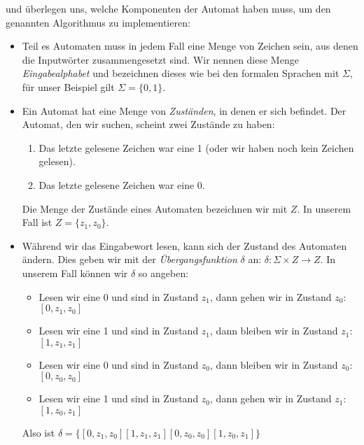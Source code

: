 und überlegen uns, welche Komponenten der Automat haben muss,
um den genannten Algorithmus zu implementieren:
\begin{itemize}
    \item Teil es Automaten muss in jedem Fall eine Menge von Zeichen sein,
        aus denen die Inputwörter zusammengesetzt sind.
        Wir nennen diese Menge \emph{Eingabealphabet}
        und bezeichnen dieses wie bei den formalen Sprachen mit $\Sigma$,
        für unser Beispiel gilt $\Sigma = \{0,1\}$.

    \item Ein Automat hat eine Menge von \emph{Zuständen}, in denen er sich befindet.
        Der Automat, den wir suchen, scheint zwei Zustände zu haben:
        \begin{enumerate}
            \item Das letzte gelesene Zeichen war eine 1
                (oder wir haben noch kein Zeichen gelesen).
            \item Das letzte gelesene Zeichen war eine 0.
        \end{enumerate}
        Die Menge der Zustände eines Automaten bezeichnen wir mit $Z$.
        In unserem Fall ist $Z = \{z_1, z_0\}$.

    \item Während wir das Eingabewort lesen,
        kann sich der Zustand des Automaten ändern.
        Dies geben wir mit der \emph{Übergangsfunktion} $\delta$ an:
        $\delta: \Sigma \times Z \rightarrow Z$.
        In unserem Fall können wir $\delta$ so angeben:
        \begin{itemize}
            \item Lesen wir eine 0 und sind in Zustand $z_1$,
                dann gehen wir in Zustand $z_0$:\linebreak
                $[0,z_1,z_0]$
            \item Lesen wir eine 1 und sind in Zustand $z_1$,
                dann bleiben wir in Zustand $z_1$:\linebreak
                $[1,z_1,z_1]$
            \item Lesen wir eine 0 und sind in Zustand $z_0$,
                dann bleiben wir in Zustand $z_0$:\linebreak
                $[0,z_0,z_0]$
            \item Lesen wir eine 1 und sind in Zustand $z_0$,
                dann gehen wir in Zustand $z_1$:\linebreak
                $[1,z_0,z_1]$
        \end{itemize}
        Also ist $\delta = \{[0,z_1,z_0] [1,z_1,z_1] [0,z_0,z_0] [1,z_0,z_1]\}$


\end{itemize}
